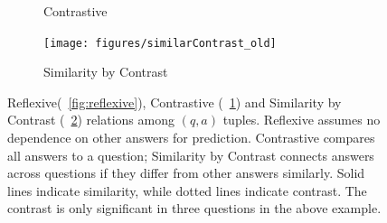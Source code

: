 \begin{figure}[h]
\begin{subfigure}{0.27\textwidth}
        \caption{Contrastive}
        \label{fig:contrastive}
    \end{subfigure}%
    \begin{subfigure}{0.25\textwidth}
        \centering
            \texttt{[image: figures/similarContrast\_old]}
      \caption{Similarity by Contrast}
      \label{fig:similar}
        \end{subfigure}%
    \caption{\small \label{fig:relation} Reflexive(~\cref{fig:reflexive}), Contrastive (~\cref{fig:contrastive}) and Similarity by Contrast (~\cref{fig:similar}) relations among $(q,a)$ tuples. Reflexive assumes no dependence on other answers for prediction. Contrastive compares all answers to a question;  Similarity by Contrast connects answers across questions if they differ from other answers similarly. Solid lines indicate similarity, while dotted lines indicate contrast. The contrast is only significant in three questions in the above example.}
    \vspace{-0.15in}
\end{figure}



